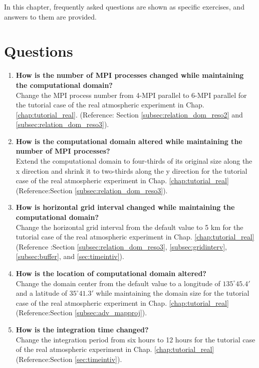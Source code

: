 
In this chapter, frequently asked questions are shown as specific exercises, and answers to them are provided. %

\section*{Questions}

\begin{enumerate}
\item {\bf How is the number of MPI processes changed while maintaining the computational domain?}\\
Change the MPI process number from 4-MPI parallel to 6-MPI parallel for the tutorial case of the real atmospheric experiment in Chap. \ref{chap:tutorial_real}.
(Reference: Section \ref{subsec:relation_dom_reso2} and \ref{subsec:relation_dom_reso3}).

\item {\bf How is the computational domain altered while maintaining the number of MPI processes?}\\
Extend the computational domain to four-thirds of its original size along the x direction and shrink it to two-thirds along the y direction for the tutorial case of the real atmospheric experiment in Chap. \ref{chap:tutorial_real} (Reference:Section \ref{subsec:relation_dom_reso3}).

\item {\bf How is horizontal grid interval changed while maintaining the computational domain?}\\ 
Change the horizontal grid interval from the default value to 5 km for the tutorial case of the real atmospheric experiment in Chap. \ref{chap:tutorial_real} (Reference :Section \ref{subsec:relation_dom_reso3}, \ref{subsec:gridinterv}, \ref{subsec:buffer}, and \ref{sec:timeintiv}).

\item {\bf How is the location of computational domain altered?}\\
Change the domain center from the default value to a longitude of $135^\circ 45.4'$ and a latitude of $35^\circ 41.3'$ while maintaining the domain size for the tutorial case of the real atmospheric experiment in Chap. \ref{chap:tutorial_real} (Reference:Section \ref{subsec:adv_mapproj}).

\item {\bf How is the integration time changed?}\\
Change the integration period from six hours to 12 hours for the tutorial case of the real atmospheric experiment in Chap. \ref{chap:tutorial_real}
(Reference:Section \ref{sec:timeintiv}).


\end{enumerate}
